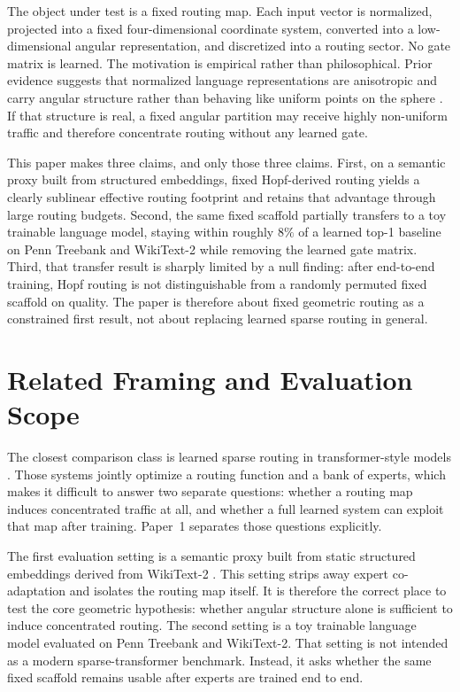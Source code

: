 \documentclass[11pt,letterpaper]{article}
\begin{document}
The object under test is a fixed routing map. Each input vector is normalized, projected into a fixed four-dimensional coordinate system, converted into a low-dimensional angular representation, and discretized into a routing sector. No gate matrix is learned. The motivation is empirical rather than philosophical. Prior evidence suggests that normalized language representations are anisotropic and carry angular structure rather than behaving like uniform points on the sphere \citep{turboquant2026}. If that structure is real, a fixed angular partition may receive highly non-uniform traffic and therefore concentrate routing without any learned gate.

This paper makes three claims, and only those three claims. First, on a semantic proxy built from structured embeddings, fixed Hopf-derived routing yields a clearly sublinear effective routing footprint and retains that advantage through large routing budgets. Second, the same fixed scaffold partially transfers to a toy trainable language model, staying within roughly $8\%$ of a learned top-1 baseline on Penn Treebank and WikiText-2 while removing the learned gate matrix. Third, that transfer result is sharply limited by a null finding: after end-to-end training, Hopf routing is not distinguishable from a randomly permuted fixed scaffold on quality. The paper is therefore about fixed geometric routing as a constrained first result, not about replacing learned sparse routing in general.

\section{Related Framing and Evaluation Scope}
The closest comparison class is learned sparse routing in transformer-style models \citep{shazeer2017outrageously,fedus2022switch}. Those systems jointly optimize a routing function and a bank of experts, which makes it difficult to answer two separate questions: whether a routing map induces concentrated traffic at all, and whether a full learned system can exploit that map after training. Paper~1 separates those questions explicitly.

The first evaluation setting is a semantic proxy built from static structured embeddings derived from WikiText-2 \citep{merity2016wt2}. This setting strips away expert co-adaptation and isolates the routing map itself. It is therefore the correct place to test the core geometric hypothesis: whether angular structure alone is sufficient to induce concentrated routing. The second setting is a toy trainable language model evaluated on Penn Treebank \citep{ptb1993} and WikiText-2. That setting is not intended as a modern sparse-transformer benchmark. Instead, it asks whether the same fixed scaffold remains usable after experts are trained end to end.
\end{document}
